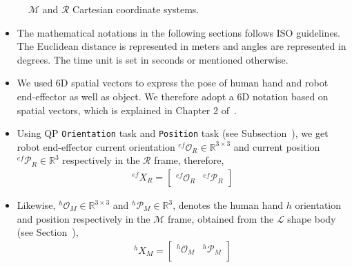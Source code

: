 \begin{figure}[ht]
	\caption{$\mathcal{M}$ and $\mathcal{R}$ Cartesian coordinate systems.}
	\label{fig:frames}
\end{figure}


\begin{itemize}
	\item The mathematical notations in the following sections follows ISO guidelines. The Euclidean distance is represented in meters and angles are represented in degrees. The time unit is set in seconds or mentioned otherwise.
	
	\item We used 6D spatial vectors to express the pose of human hand and robot end-effector as well as object. We therefore adopt a 6D notation based on spatial vectors, which is explained in Chapter 2 of~\cite{featherstone2014rigid}.
	
	\item Using QP \texttt{Orientation} task and \texttt{Position} task (see Subsection~), we get robot end-effector current orientation ${{}^{ef}\mathcal{O}_R} \in \mathbb{R}^{3\times3}$ and current position ${{}^{ef}\mathcal{P}_R} \in \mathbb{R}^{3}$ respectively in the $\mathcal{R}$ frame, therefore,
	\begin{gather}\label{X_R_ef}
	{}^{ef}{X}_R =
	\left[\begin{array}{cc}
	{}^{ef}\mathcal{O}_R & {}^{ef}\mathcal{P}_R
	\end{array}\right]
	\end{gather}
	
	\item Likewise, ${{}^{h}\mathcal{O}_M} \in \mathbb{R}^{3\times3}$ and ${{}^{h}\mathcal{P}_M} \in \mathbb{R}^{3}$, denotes the human hand $h$ orientation and position respectively in the $\mathcal{M}$ frame, obtained from the $\mathcal{L}$ shape body (see Section~),
	\begin{gather}\label{X_M_h}
	{}^{h}{X}_M =
	\left[\begin{array}{cc}
	{}^{h}\mathcal{O}_M & {}^{h}\mathcal{P}_M \\
	\end{array}\right]
	\end{gather}
	

\end{itemize}
